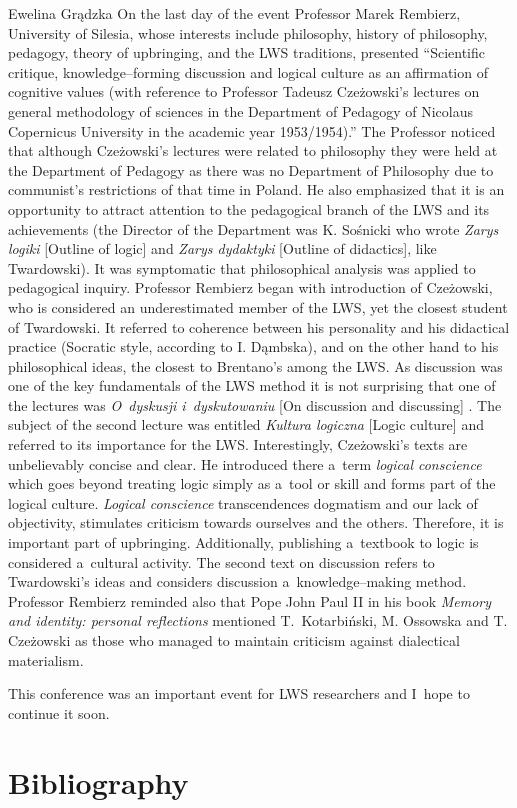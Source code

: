 \begin{editorialeng}{Ewelina Grądzka}
On the last day of the event Professor Marek Rembierz, University of Silesia, whose interests include philosophy, history of philosophy, pedagogy, theory of upbringing, and the LWS traditions, presented ``Scientific critique, knowledge--forming discussion and logical culture as an affirmation of cognitive values (with reference to Professor Tadeusz Czeżowski’s lectures on general methodology of sciences in the Department of Pedagogy of Nicolaus Copernicus University in the academic year 1953/1954).'' The Professor noticed that although Czeżowski’s lectures were related to philosophy they were held at the Department of Pedagogy as there was no Department of Philosophy due to communist’s restrictions of that time in Poland. He also emphasized that it is an opportunity to attract attention to the pedagogical branch of the LWS and its achievements (the Director of the Department was K. Sośnicki who wrote \textit{Zarys logiki} [Outline of logic] and \textit{Zarys dydaktyki} [Outline of didactics], like Twardowski). It was symptomatic that philosophical analysis was applied to pedagogical inquiry. Professor Rembierz began with introduction of Czeżowski, who is considered an underestimated member of the LWS, yet the closest student of Twardowski. It referred to coherence between his personality and his didactical practice (Socratic style, according to I. Dąmbska), and on the other hand to his philosophical ideas, the closest to Brentano’s among the LWS. As discussion was one of the key fundamentals of the LWS method it is not surprising that one of the lectures was \textit{O~dyskusji i~dyskutowaniu} [On discussion and discussing]
\parencite[][]{czezowski_o_1969}. %
 The subject of the second lecture was entitled \textit{Kultura logiczna} [Logic culture] 
\parencite[][]{czezowski_kultura_1969} %
 and referred to its importance for the LWS. Interestingly, Czeżowski’s texts are unbelievably concise and clear. He introduced there a~term \textit{logical conscience} which goes beyond treating logic simply as a~tool or skill and forms part of the logical culture. \textit{Logical conscience} transcendences dogmatism and our lack of objectivity, stimulates criticism towards ourselves and the others. Therefore, it is important part of upbringing. Additionally, publishing a~textbook to logic is considered a~cultural activity. The second text on discussion refers to Twardowski’s ideas and considers discussion a~knowledge--making method. Professor Rembierz reminded also that Pope John Paul II in his book \textit{Memory and identity: personal reflections} 
\parencite[][]{john_paul_ii_memory_2005} %
 mentioned T.~Kotarbiński, M. Ossowska and T. Czeżowski as those who managed to maintain criticism against dialectical materialism.

This conference was an important event for LWS researchers and I~hope to continue it soon.

\section*{Bibliography}%
		\printbibliography[heading=none]\nopagebreak[4]

\end{editorialeng}